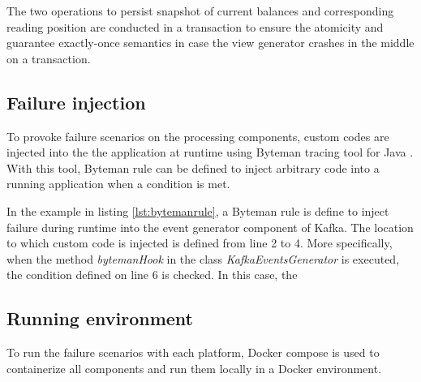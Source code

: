 The two operations to persist snapshot of current balances and corresponding reading position are conducted in a transaction to ensure the atomicity and guarantee exactly-once semantics in case the view generator crashes in the middle on a transaction.

\subsection{Failure injection}
To provoke failure scenarios on the processing components, custom codes are injected into the the application at runtime using Byteman tracing tool for Java \cite{byteman}. With this tool, Byteman rule can be defined to inject arbitrary code into a running application when a condition is met. 

 

In the example in listing \ref{lst:bytemanrule}, a Byteman rule is define to inject failure during runtime into the event generator component of Kafka. The location to which custom code is injected is defined from line 2 to 4. More specifically, when the method \emph{bytemanHook} in the class \emph{KafkaEventsGenerator} is executed, the condition defined on line 6 is checked. In this case, the 

\subsection{Running environment}
To run the failure scenarios with each platform, Docker compose is used to containerize all components and run them locally in a Docker environment. 